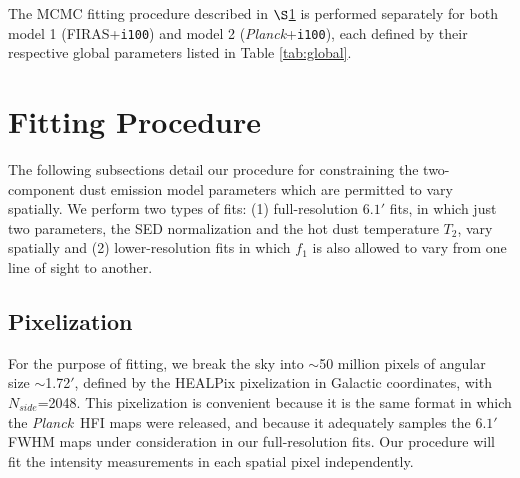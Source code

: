 \documentclass{emulateapj}
\newcommand{\PLANCK}{{\it Planck}}
\begin{document}
The MCMC fitting procedure described in $\S$\ref{sec:fitting} is performed
separately for both model 1 (FIRAS+\verb|i100|) and model 2 
(\PLANCK+\verb|i100|), each defined by their respective global parameters 
listed in Table \ref{tab:global}.




\section{Fitting Procedure}
\label{sec:fitting}

The following subsections detail our procedure for constraining the 
two-component dust emission model parameters which are permitted to vary
spatially. We perform two types of fits: (1) full-resolution 
$6.1'$ fits, in which just two parameters, the SED normalization and the hot 
dust temperature $T_2$, vary spatially and (2) lower-resolution fits in which 
$f_1$ is also allowed to vary from one line of sight to another.

\subsection{Pixelization}
\label{sec:pix}
For the purpose of fitting, we break the sky into $\sim$50 million pixels of 
angular size $\sim$1.72$'$, defined by the HEALPix pixelization in Galactic 
coordinates, with $N_{side}$=2048. This pixelization is convenient because it 
is the same format in which the \PLANCK~HFI maps were released, and because it 
adequately samples the $6.1'$ FWHM maps under consideration in our 
full-resolution fits. Our procedure will fit the intensity measurements in each
spatial pixel independently.
\end{document}
